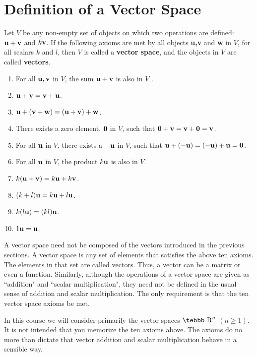 \section{Definition of a Vector Space} \label{ssec.defvs}
Let $V$ be any non-empty set of objects on which two operations
are defined: ${\bf u}+{\bf v}$ and $k{\bf v}$.  If the following
axioms are met by all objects {\bf u,v} and {\bf w} in $V$, for
all scalars $k$ and $l$, then $V$ is called a {\bf vector space},
and the objects in $V$ are called {\bf vectors}.
\begin{enumerate}
\item For all ${\bf u, v}$ in $ V$, the sum ${\bf u}+{\bf v}$ is also in $V$ .
\item ${\bf u}+{\bf v}={\bf v}+{\bf u}$.
\item ${\bf u}+({\bf v}+{\bf w})=({\bf u}+{\bf v})+{\bf w}$.
\item There exists a zero element, ${\bf 0}$ in $V$, such that ${\bf 0+v}={\bf
v+0}={\bf v}$.
\item For all ${\bf u}$ in $V$, there exists a ${\bf -u}$ in $V$, such that
${\bf u +(-u)}={\bf (-u)+u}={\bf 0}$.
\item For all ${\bf u}$ in $V$, the product $k{\bf u}$ is also in $V$.
\item $k({\bf u}+{\bf v})=k{\bf u}+k{\bf v}$.
\item $(k+l){\bf u}=k{\bf u}+l{\bf u}$.
\item $k(l{\bf u})=(kl){\bf u}$.
\item $1{\bf u}={\bf u}$.
\end{enumerate}

A vector space need not be composed of the vectors introduced in
the previous sections.  A vector space is any set of elements that
satisfies the above ten axioms.  The elements in that set are called vectors.
Thus, a vector can be
a matrix or even a function. Similarly, although the operations of
a vector space are given as ``addition" and ``scalar
multiplication", they need not be defined in the usual sense of
addition and scalar multiplication. The only requirement is that
the ten vector space axioms be met.

In this course we will consider primarily the vector spaces
$\mbox{\tebbb R}^n$ $(n\geq1)$. It is not intended that you
memorize the ten axioms above. The axioms do no more than dictate
that vector addition and scalar multiplication behave in a
sensible way.

